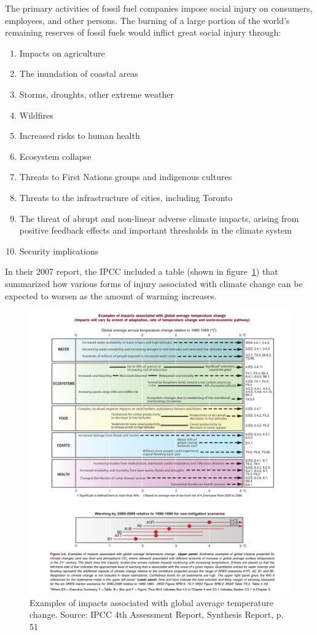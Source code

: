 \documentclass[10pt]{article}
\begin{document}
The primary activities of fossil fuel companies impose social injury on consumers, employees, and other persons.
The burning of a large portion of the world's remaining reserves of fossil fuels would inflict great social injury through:
\begin{enumerate}
\item Impacts on agriculture
\item The inundation of coastal areas
\item Storms, droughts, other extreme weather
\item Wildfires
\item Increased risks to human health
\item Ecosystem collapse 
\item Threats to First Nations groups and indigenous cultures
\item Threats to the infrastructure of cities, including Toronto
\item The threat of abrupt and non-linear adverse climate impacts, arising from positive feedback effects and important thresholds in the climate system
\item Security implications
\end{enumerate}
In their 2007 report, the IPCC included a table (shown in figure~\ref{fig:IPCCImpacts}) that summarized how various forms of injury associated with climate change can be expected to worsen as the amount of warming increases.



\begin{figure}
\includegraphics[width=160mm]{s3-variousimpacts.png}
\centering
\caption{Examples of impacts associated with global average temperature change. Source: IPCC 4th Assessment Report, Synthesis Report, p. 51}
\label{fig:IPCCImpacts}
\end{figure}
\end{document}

